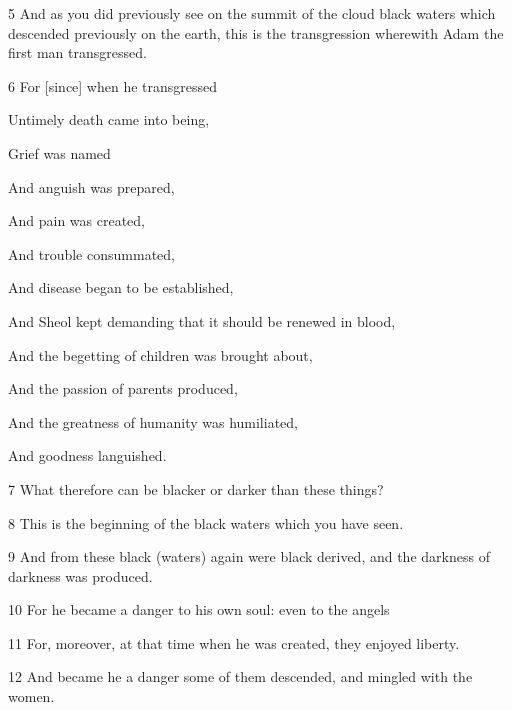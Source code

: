 \par 5 And as you did previously see on the summit of the cloud black waters which descended previously on the earth, this is the transgression wherewith Adam the first man transgressed.

\par 6 For [since] when he transgressed

\par Untimely death came into being,

\par Grief was named

\par And anguish was prepared,

\par And pain was created,

\par And trouble consummated,

\par And disease began to be established,

\par And Sheol kept demanding that it should be renewed in blood,

\par And the begetting of children was brought about,

\par And the passion of parents produced,

\par And the greatness of humanity was humiliated,

\par And goodness languished.

\par 7 What therefore can be blacker or darker than these things? 

\par 8 This is the beginning of the black waters which you have seen. 

\par 9 And from these black (waters) again were black derived, and the darkness of darkness was produced. 

\par 10 For he became a danger to his own soul: even to the angels 

\par 11 For, moreover, at that time when he was created, they enjoyed liberty. 

\par 12 And became he a danger some of them descended, and mingled with the women. 


